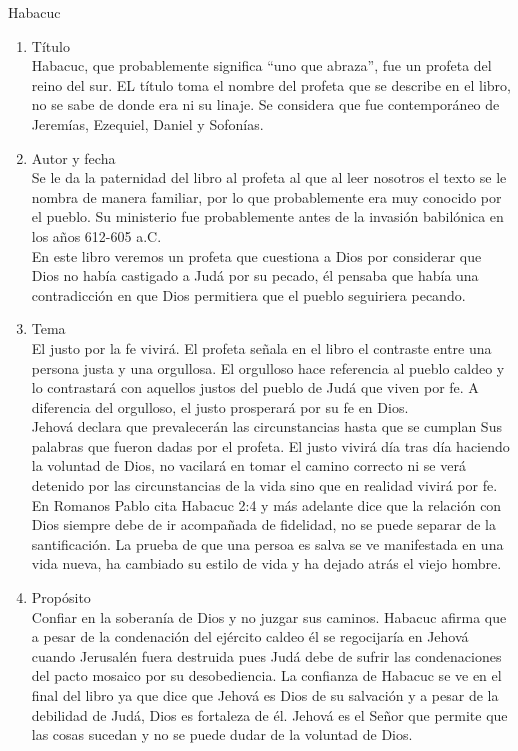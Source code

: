 %
%
\begin{section}{Habacuc}
	\begin{enumerate}
		\item Título\\
			Habacuc, que probablemente significa ``uno que abraza'', fue un profeta del reino del sur. EL título toma el nombre del profeta que se describe en el libro, no se sabe de donde era ni su linaje. Se considera que fue contemporáneo de Jeremías, Ezequiel, Daniel y Sofonías.
		\item Autor y fecha\\
			Se le da la paternidad del libro al profeta al que al leer nosotros el texto se le nombra de manera familiar, por lo que probablemente era muy conocido por el pueblo. Su ministerio fue probablemente antes de la invasión babilónica en los años 612-605 a.C.\\
			En este libro veremos un profeta que cuestiona a Dios por considerar que Dios no había castigado a Judá por su pecado, él pensaba que había una contradicción en que Dios permitiera que el pueblo seguiriera pecando.
		\item Tema\\
			El justo por la fe vivirá. El profeta señala en el libro el contraste entre una persona justa y una orgullosa. El orgulloso hace referencia al pueblo caldeo y lo contrastará con aquellos justos del pueblo de Judá que viven por fe. A diferencia del orgulloso, el justo prosperará por su fe en Dios.\\
			Jehová declara que prevalecerán las circunstancias hasta que se cumplan Sus palabras que fueron dadas por el profeta. El justo vivirá día tras día haciendo la voluntad de Dios, no vacilará en tomar el camino correcto ni se verá detenido por las circunstancias de la vida sino que en realidad vivirá por fe. En Romanos Pablo cita Habacuc 2:4 y más adelante dice que la relación con Dios siempre debe de ir acompañada de fidelidad, no se puede separar de la santificación. La prueba de que una persoa es salva se ve manifestada en una vida nueva, ha cambiado su estilo de vida y ha dejado atrás el viejo hombre.\\
		\item Propósito\\
			Confiar en la soberanía de Dios y no juzgar sus caminos. Habacuc afirma que a pesar de la condenación del ejército caldeo él se regocijaría en Jehová cuando Jerusalén fuera destruida pues Judá debe de sufrir las condenaciones del pacto mosaico por su desobediencia. La confianza de Habacuc se ve en el final del libro ya que dice que Jehová es Dios de su salvación y a pesar de la debilidad de Judá, Dios es fortaleza de él. Jehová es el Señor que permite que las cosas sucedan y no se puede dudar de la voluntad de Dios.

\end{enumerate}
\end{section}
